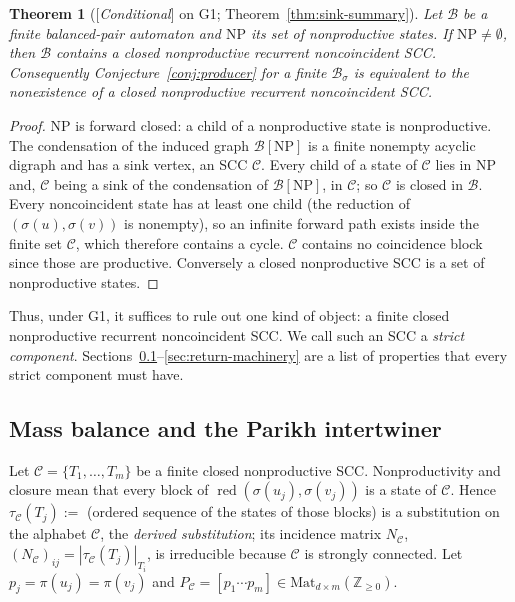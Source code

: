 \documentclass[11pt]{amsart}
\theoremstyle{plain}
\newtheorem{theorem}{Theorem}[section]
\theoremstyle{definition}
\theoremstyle{remark}
\newcommand{\Z}{\mathbb{Z}}
\newcommand{\B}{\mathcal{B}}
\newcommand{\cC}{\mathcal{C}}
\newcommand{\NP}{\mathrm{NP}}
\newcommand{\red}{\operatorname{red}}
\newcommand{\Status}[1]{\textup{[\textit{#1}]}}
\begin{document}
\begin{theorem}[\Status{Conditional} on G1; Theorem~\ref{thm:sink-summary}]\label{thm:sink}
Let $\B$ be a finite balanced-pair automaton and $\NP$ its set of nonproductive states. If $\NP\ne\emptyset$, then $\B$ contains a closed nonproductive recurrent noncoincident SCC. Consequently Conjecture~\ref{conj:producer} for a finite $\B_\sigma$ is equivalent to the nonexistence of a closed nonproductive recurrent noncoincident SCC.
\end{theorem}
\begin{proof}
$\NP$ is forward closed: a child of a nonproductive state is nonproductive. The condensation of the induced graph $\B[\NP]$ is a finite nonempty acyclic digraph and has a sink vertex, an SCC $\cC$. Every child of a state of $\cC$ lies in $\NP$ and, $\cC$ being a sink of the condensation of $\B[\NP]$, in $\cC$; so $\cC$ is closed in $\B$. Every noncoincident state has at least one child (the reduction of $(\sigma(u),\sigma(v))$ is nonempty), so an infinite forward path exists inside the finite set $\cC$, which therefore contains a cycle. $\cC$ contains no coincidence block since those are productive. Conversely a closed nonproductive SCC is a set of nonproductive states.
\end{proof}

Thus, under G1, it suffices to rule out one kind of object: a finite closed nonproductive recurrent noncoincident SCC. We call such an SCC a \emph{strict component}. Sections~\ref{sec:parikh}--\ref{sec:return-machinery} are a list of properties that every strict component must have.

\subsection{Mass balance and the Parikh intertwiner}\label{sec:parikh}

Let $\cC=\{T_1,\dots,T_m\}$ be a finite closed nonproductive SCC. Nonproductivity and closure mean that every block of $\red(\sigma(u_j),\sigma(v_j))$ is a state of $\cC$. Hence $\tau_\cC(T_j):=$ (ordered sequence of the states of those blocks) is a substitution on the alphabet $\cC$, the \emph{derived substitution}; its incidence matrix $N_\cC$, $(N_\cC)_{ij}=|\tau_\cC(T_j)|_{T_i}$, is irreducible because $\cC$ is strongly connected. Let $p_j=\pi(u_j)=\pi(v_j)$ and $P_\cC=[p_1\cdots p_m]\in\mathrm{Mat}_{d\times m}(\Z_{\ge0})$.
\end{document}

